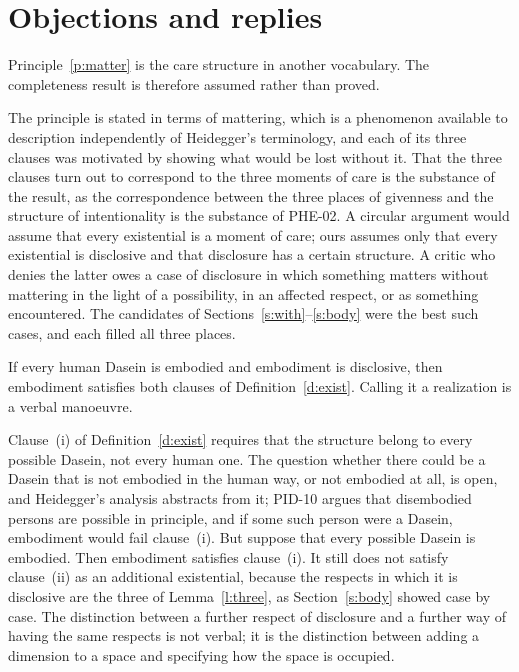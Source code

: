 \documentclass{situationist-preprint}
\begin{document}
\section{Objections and replies}\label{s:obj}

\begin{objection}[Circularity]\label{o:circ}
Principle~\ref{p:matter} is the care structure in another vocabulary. The completeness result is therefore assumed rather than proved.
\end{objection}

\begin{reply}
The principle is stated in terms of mattering, which is a phenomenon available to description independently of Heidegger's terminology, and each of its three clauses was motivated by showing what would be lost without it. That the three clauses turn out to correspond to the three moments of care is the substance of the result, as the correspondence between the three places of givenness and the structure of intentionality is the substance of PHE-02. A circular argument would assume that every existential is a moment of care; ours assumes only that every existential is disclosive and that disclosure has a certain structure. A critic who denies the latter owes a case of disclosure in which something matters without mattering in the light of a possibility, in an affected respect, or as something encountered. The candidates of Sections~\ref{s:with}--\ref{s:body} were the best such cases, and each filled all three places.
\end{reply}

\begin{objection}\label{o:real}
If every human Dasein is embodied and embodiment is disclosive, then embodiment satisfies both clauses of Definition~\ref{d:exist}. Calling it a realization is a verbal manoeuvre.
\end{objection}

\begin{reply}
Clause~(i) of Definition~\ref{d:exist} requires that the structure belong to every possible Dasein, not every human one. The question whether there could be a Dasein that is not embodied in the human way, or not embodied at all, is open, and Heidegger's analysis abstracts from it; PID-10 argues that disembodied persons are possible in principle, and if some such person were a Dasein, embodiment would fail clause~(i). But suppose that every possible Dasein is embodied. Then embodiment satisfies clause~(i). It still does not satisfy clause~(ii) as an additional existential, because the respects in which it is disclosive are the three of Lemma~\ref{l:three}, as Section~\ref{s:body} showed case by case. The distinction between a further respect of disclosure and a further way of having the same respects is not verbal; it is the distinction between adding a dimension to a space and specifying how the space is occupied.
\end{reply}
\end{document}

